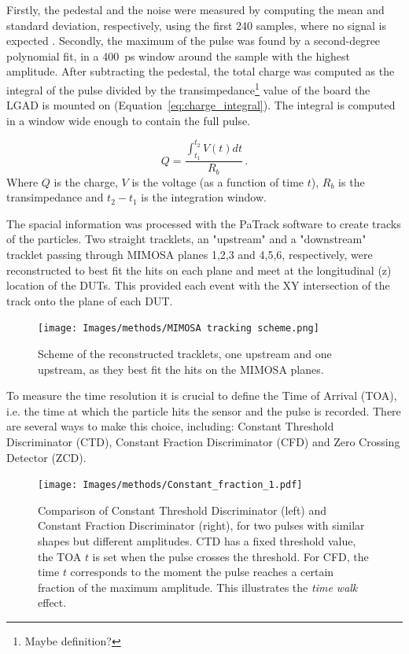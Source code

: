 Firstly, the pedestal and the noise were measured by computing the mean and standard deviation, respectively, using the first 240 samples, where no signal is expected \cite{Allaire:2018bof}. Secondly, the maximum of the pulse was found by a second-degree polynomial fit, in a \qty{400}{\pico\second} window around the sample with the highest amplitude. After subtracting the pedestal, the total charge was computed as the integral of the pulse divided by the transimpedance\footnote{Maybe definition?} value of the board the LGAD is mounted on (Equation~\ref{eq:charge_integral}). The integral is computed in a window wide enough to contain the full pulse.

\begin{equation}\label{eq:charge_integral}
    Q = \frac{\int_{t_1}^{t_2} V(t)dt}{R_b} \, .
\end{equation}
Where $Q$ is the charge, $V$ is the voltage (as a function of time $t$), $R_b$ is the transimpedance and $t_2-t_1$ is the integration window.

The spacial information was processed with the PaTrack software to create tracks of the particles. Two straight tracklets, an "upstream" and a "downstream" tracklet passing through MIMOSA planes 1,2,3 and 4,5,6, respectively, were reconstructed to best fit the hits on each plane and meet at the longitudinal (z) location of the DUTs. This provided each event with the XY intersection of the track onto the plane of each DUT. 

\begin{figure}[!hb]
    \centering
    \texttt{[image: Images/methods/MIMOSA tracking scheme.png]}
    \captionsetup{width=.8\linewidth}
    \caption{Scheme of the reconstructed tracklets, one upstream and one upstream, as they best fit the hits on the MIMOSA planes.}
    \label{fig:mimosa_tracking}
\end{figure} 


To measure the time resolution it is crucial to define the Time of Arrival (TOA), i.e. the time at which the particle hits the sensor and the pulse is recorded. There are several ways to make this choice, including: Constant Threshold Discriminator (CTD), Constant Fraction Discriminator (CFD) and Zero Crossing Detector (ZCD).

\begin{figure}[!hb]
    \centering
    \texttt{[image: Images/methods/Constant\_fraction\_1.pdf]}
    \captionsetup{width=.8\linewidth}
    \caption{Comparison of Constant Threshold Discriminator (left) and Constant Fraction Discriminator (right), for two pulses with similar shapes but different amplitudes. CTD has a fixed threshold value, the TOA $t$ is set when the pulse crosses the threshold. For CFD, the time $t$ corresponds to the moment the pulse reaches a certain fraction of the maximum amplitude. This illustrates the \textit{time walk} effect.}
    \label{fig:constant fraction}
\end{figure} 

